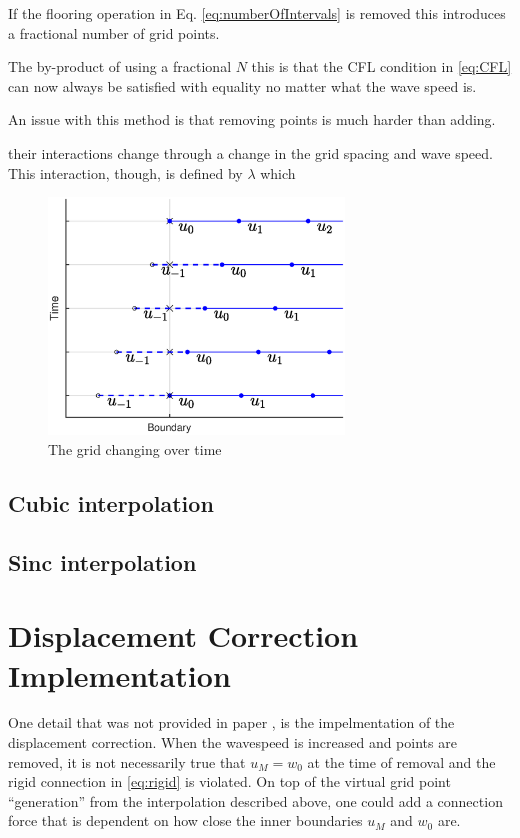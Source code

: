 If the flooring operation in Eq. \eqref{eq:numberOfIntervals} is removed this introduces a fractional number of grid points.


The by-product of using a fractional $N$ this is that the CFL condition in \eqref{eq:CFL} can now always be satisfied with equality no matter what the wave speed is.

An issue with this method is that removing points is much harder than adding.

their interactions change through a change in the grid spacing and wave speed. This interaction, though, is defined by $\lambda$ which 

\begin{figure}
    \centering
\includegraphics[width=0.7\textwidth]{figures/contributions/dynamicgrid/boundaryGrid.eps}
\caption{\label{fig:changingBoundary}{The grid changing over time}}
\end{figure}

\subsection{Cubic interpolation}

\subsection{Sinc interpolation}


\section{Displacement Correction Implementation} 
One detail that was not provided in paper \citeP[G], is the impelmentation of the displacement correction.
When the wavespeed is increased and points are removed, it is not necessarily true that $u_M = w_0$ at the time of removal and the rigid connection in \eqref{eq:rigid} is violated. On top of the virtual grid point ``generation'' from the interpolation described above, one could add a connection force that is dependent on how close the inner boundaries $u_M$ and $w_0$ are.

